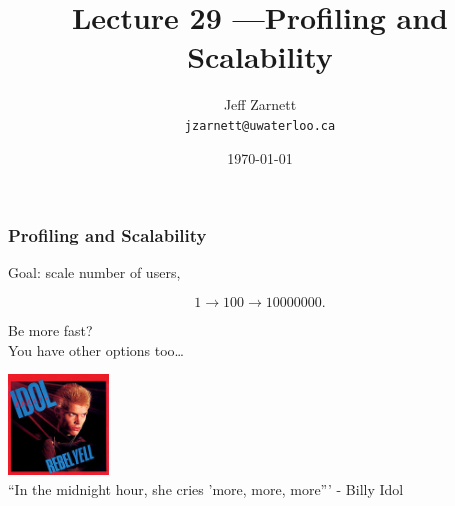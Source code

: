 

\title{Lecture 29 ---Profiling and Scalability}

\author{Jeff Zarnett\\ \small \texttt{jzarnett@uwaterloo.ca}}
\date{\today}




\begin{frame}
  \titlepage

 \end{frame}



\begin{frame}
\frametitle{Profiling and Scalability}


\begin{changemargin}{2cm}
Goal: scale number of users,

\[ 1 \rightarrow 100 \rightarrow 10 000 000. \]

Be more fast? \\
You have other options too\ldots
\end{changemargin}

\begin{center}
	\includegraphics[width=0.2\textwidth]{images/Rebel_Yell.jpg}\\
	\hfill ``In the midnight hour, she cries 'more, more, more''' - Billy Idol
\end{center}

\end{frame}


